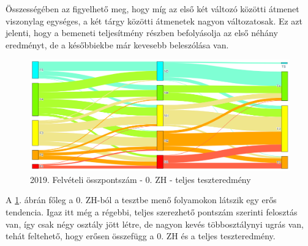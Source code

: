\documentclass[12pt]{article}
\begin{document}
Összességében az figyelhető meg, hogy míg az első két változó közötti átmenet viszonylag egységes, a két tárgy közötti átmenetek nagyon változatosak. Ez azt jelenti, hogy a bemeneti teljesítmény részben befolyásolja az első néhány eredményt, de a későbbiekbe már kevesebb beleszólása van.





\begin{figure}[H]
\centering
\includegraphics[width = \textwidth]{kepek/2019_old_felvi_0zh_teszt.png}
\caption{2019. Felvételi összpontszám - 0. ZH - teljes teszteredmény}
\label{fig:2019_old_felvi_0zh_teszt}
\end{figure}

A \ref{fig:2019_old_felvi_0zh_teszt}. ábrán főleg a 0. ZH-ból a tesztbe menő folyamokon látszik egy erős tendencia. Igaz itt még a régebbi, teljes szerezhető pontszám szerinti felosztás van, így csak négy osztály jött létre, de nagyon kevés többosztálynyi ugrás van, tehát feltehető, hogy erősen összefügg a 0. ZH és a teljes teszteredmény.
\end{document}
